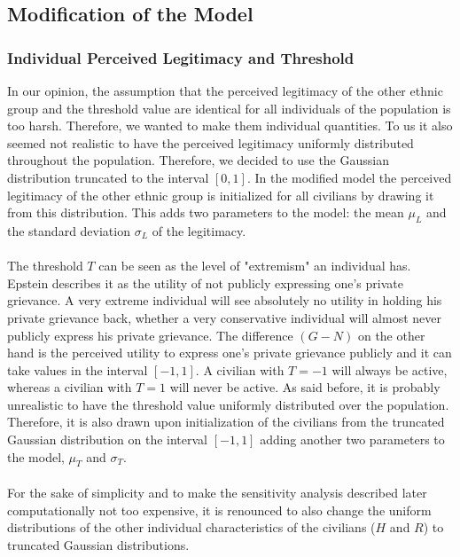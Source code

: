 \documentclass[11pt]{article}
\begin{document}
\subsection{Modification of the Model}

\subsubsection{Individual Perceived Legitimacy and Threshold}
In our opinion, the assumption that the perceived legitimacy of the other ethnic group and the threshold value are identical for all individuals of the population is too harsh. Therefore, we wanted to make them individual quantities. To us it also seemed not realistic to have the perceived legitimacy uniformly distributed throughout the population. Therefore, we decided to use the Gaussian distribution truncated to the interval $[0,1]$. In the modified model the perceived legitimacy of the other ethnic group is initialized for all civilians by drawing it from this distribution. This adds two parameters to the model: the mean $\mu_L$ and the standard deviation $\sigma_L$ of the legitimacy.\\
\\
The threshold $T$ can be seen as the level of "extremism" an individual has. Epstein describes it as the utility of not publicly expressing one's private grievance. A very extreme individual will see absolutely no utility in holding his private grievance back, whether a very conservative individual will almost never publicly express his private grievance. The difference $(G-N)$ on the other hand is the perceived utility to express one's private grievance publicly and it can take values in the interval $[-1,1]$. A civilian with $T = -1$ will always be active, whereas a civilian with $T = 1$ will never be active. As said before, it is probably unrealistic to have the threshold value uniformly distributed over the population. Therefore, it is also drawn upon initialization of the civilians from the truncated Gaussian distribution on the interval $[-1,1]$ adding another two parameters to the model, $\mu_T$ and $\sigma_T$.\\
\\
For the sake of simplicity and to make the sensitivity analysis described later computationally not too expensive, it is renounced to also change the uniform distributions of the other individual characteristics of the civilians ($H$ and $R$) to truncated Gaussian distributions.
\end{document}
